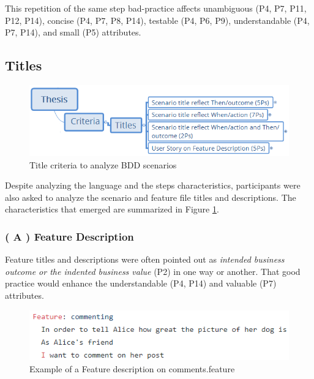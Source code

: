 This repetition of the same step bad-practice affects unambiguous (P4, P7, P11, P12, P14), concise (P4, P7, P8, P14), testable (P4, P6, P9), understandable (P4, P7, P14), and small (P5) attributes.


\subsection{Titles}

\begin{figure}[t]
	\centering
	\includegraphics[scale=0.8]{images/title_criteria}
	\caption[\hspace{2mm}Title criteria to analyze BDD scenarios]{Title criteria to analyze BDD scenarios}
	\label{fig:title_criteria}
\end{figure}

Despite analyzing the language and the steps characteristics, participants were also asked to analyze the scenario and feature file titles and descriptions. The characteristics that emerged are summarized in Figure \ref{fig:title_criteria}.

\subsubsection{\textbf{( A ) Feature Description}}
Feature titles and descriptions were often pointed out as \textit{intended business outcome or the indented business value} (P2) in one way or another. That good practice would enhance the understandable (P4, P14) and valuable (P7) attributes.

\begin{figure}[t]
	\centering
	\includegraphics[scale=0.8]{images/feature_description_example}
	\caption[\hspace{2mm}Example of a Feature description on comments.feature]{Example of a Feature description on comments.feature}
	\label{fig:feature_description_example}
\end{figure}

